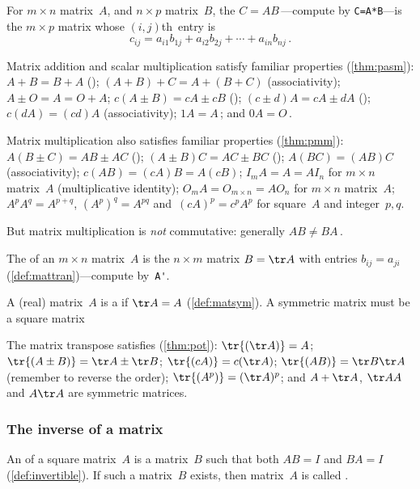 \begin{itemize}
\begin{itemize}
\itemhi For \(m\times n\) matrix~\(A\), and \(n\times p\) matrix~\(B\), the  \(C=AB\)\,---compute by \verb|C=A*B|---is the \(m\times p\) matrix whose \((i,j)\)th~entry is
\begin{equation*}
c_{ij}=a_{i1}b_{1j}+a_{i2}b_{2j}+\cdots+a_{in}b_{nj}\,.
\end{equation*}

\end{itemize}

\itemme Matrix addition and scalar multiplication satisfy familiar properties (\cref{thm:pasm}): 
 \(A+B=B+A\) ();
 \((A+B)+C=A+(B+C)\) (associativity);
 \(A\pm O=A=O+A\);
 \(c(A\pm B)=cA\pm cB\) ();
 \((c\pm d)A=cA\pm dA\) ();
 \(c(dA)=(cd)A\) (associativity);
 \(1A=A\)\,; and 
 \(0A=O\)\,.
 
\itemme Matrix multiplication also satisfies familiar properties (\cref{thm:pmm}):
 \(A(B\pm C)=AB\pm AC\) ();
 \((A\pm B)C=AC\pm BC\) ();
 \(A(BC)=(AB)C\) (associativity);
 \(c(AB)=(cA)B=A(cB)\);
 \(I_mA=A=AI_n\) for \(m\times n\) matrix~\(A\) (multiplicative identity);
 \(O_mA=O_{m\times n}=AO_n\)  for \(m\times n\) matrix~\(A\);
 \(A^pA^q=A^{p+q}\), \((A^p)^q=A^{pq}\) and~\((cA)^p=c^pA^p\) for square~\(A\) and integer~\(p,q\).
 
But matrix multiplication is \emph{not} commutative: generally \(AB\neq BA\)\,.

\itemhi The  of an \(m\times n\) matrix~\(A\) is the \(n\times m\) matrix \(B=\tr A\) with entries \(b_{ij}=a_{ji}\) (\cref{def:mattran})---compute by~\verb|A'|.

A (real) matrix~\(A\) is a  if \(\tr A=A\) (\cref{def:matsym}).
A symmetric matrix must be a square matrix

\itemme The matrix transpose satisfies (\cref{thm:pot}):
\(\tr{(\tr A)}=A\);
\(\tr{(A\pm B)}=\tr A\pm \tr B\);
\(\tr{(cA)}=c(\tr A)\);
\(\tr{(AB)}=\tr B\tr A\) (remember to reverse the order);
\(\tr{(A^p)}=(\tr A)^p\);
and \(A+\tr A\),  \(\tr AA\) and \(A\tr A\) are symmetric matrices.





\subsubsection{The inverse of a matrix}

\itemhi An  of a square matrix~\(A\) is a matrix~\(B\) such that both \(AB=I\) and \(BA=I\) (\cref{def:invertible}).
If such a matrix~\(B\) exists, then matrix~\(A\) is called .


\end{itemize}
